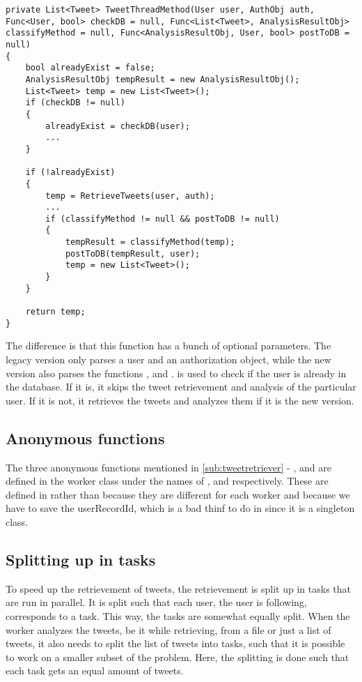 \begin{minipage}[H]{\linewidth}
\begin{lstlisting}[caption = The TweetThreadMethod function, label =
tweetthreadmethod]
private List<Tweet> TweetThreadMethod(User user, AuthObj auth, Func<User, bool> checkDB = null, Func<List<Tweet>, AnalysisResultObj> classifyMethod = null, Func<AnalysisResultObj, User, bool> postToDB = null)
{
    bool alreadyExist = false;
    AnalysisResultObj tempResult = new AnalysisResultObj();
    List<Tweet> temp = new List<Tweet>();
    if (checkDB != null)
    {
        alreadyExist = checkDB(user);
		...
    }

    if (!alreadyExist)
    {
        temp = RetrieveTweets(user, auth);
		...	
        if (classifyMethod != null && postToDB != null)
        {
            tempResult = classifyMethod(temp); 
            postToDB(tempResult, user); 
            temp = new List<Tweet>();
        }
    }

    return temp;
}
\end{lstlisting}
\end{minipage}
The difference is that this function has a bunch of optional parameters. The legacy version only parses
a user and an authorization object, while the new version also parses the
functions ,  and .
 is used to check if the user is already in the database. If it
is, it skips the tweet retrievement and analysis of the particular user. If it is not, it retrieves the tweets and analyzes them if it
is the new version.\\

\subsection{Anonymous functions}
The three anonymous functions mentioned in \autoref{sub:tweetretriever} -
,  and  are defined in the
worker class under the names of ,
 and  respectively. These are defined
in  rather than  because they are different
for each worker and because we have to save the userRecordId, which is a bad
thinf to do in  since it is a singleton class.

\subsection{Splitting up in tasks}
To speed up the retrievement of tweets, the retrievement is split up in tasks
that are run in parallel. It is split such that each user, the user is following, corresponds
to a task. This way, the tasks are somewhat equally split. 
When the worker analyzes the tweets, be it while retrieving, from a file or
just a list of tweets, it also needs to split the list of tweets into tasks,
such that it is possible to work on a smaller subset of the problem. Here, the splitting is done such that each task gets an equal amount of
tweets.

